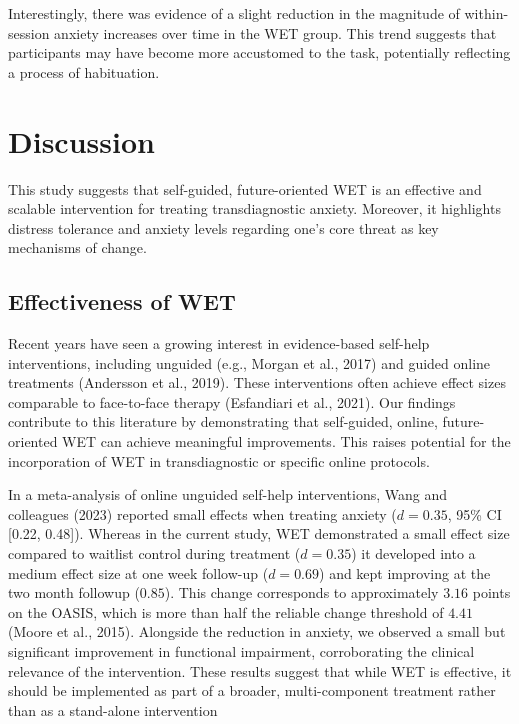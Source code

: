 \documentclass[
  man,floatsintext]{apa7}
\begin{document}
Interestingly, there was evidence of a slight reduction in the magnitude of within-session anxiety increases over time in the WET group.
This trend suggests that participants may have become more accustomed to the task, potentially reflecting a process of habituation.

\section{Discussion}\label{discussion}

This study suggests that self-guided, future-oriented WET is an effective and scalable intervention for treating transdiagnostic anxiety.
Moreover, it highlights distress tolerance and anxiety levels regarding one's core threat as key mechanisms of change.

\subsection{Effectiveness of WET}\label{effectiveness-of-wet}

Recent years have seen a growing interest in evidence-based self-help interventions, including unguided (e.g., Morgan et al., 2017) and guided online treatments (Andersson et al., 2019).
These interventions often achieve effect sizes comparable to face-to-face therapy (Esfandiari et al., 2021).
Our findings contribute to this literature by demonstrating that self-guided, online, future-oriented WET can achieve meaningful improvements.
This raises potential for the incorporation of WET in transdiagnostic or specific online protocols.

In a meta-analysis of online unguided self-help interventions, Wang and colleagues (2023)
reported small effects when treating anxiety (\(d = 0.35\), 95\% CI {[}0.22, 0.48{]}).
Whereas in the current study, WET demonstrated a small effect size compared to waitlist control during treatment (\(d = 0.35\)) it developed into a medium effect size at one week follow-up (\(d = 0.69\)) and kept improving at the two month followup (\(0.85\)).
This change corresponds to approximately \(3.16\) points on the OASIS, which is more than half the reliable change threshold of \(4.41\) (Moore et al., 2015).
Alongside the reduction in anxiety, we observed a small but significant improvement in functional impairment, corroborating the clinical relevance of the intervention.
These results suggest that while WET is effective, it should be implemented as part of a broader, multi-component treatment rather than as a stand-alone intervention
\end{document}
